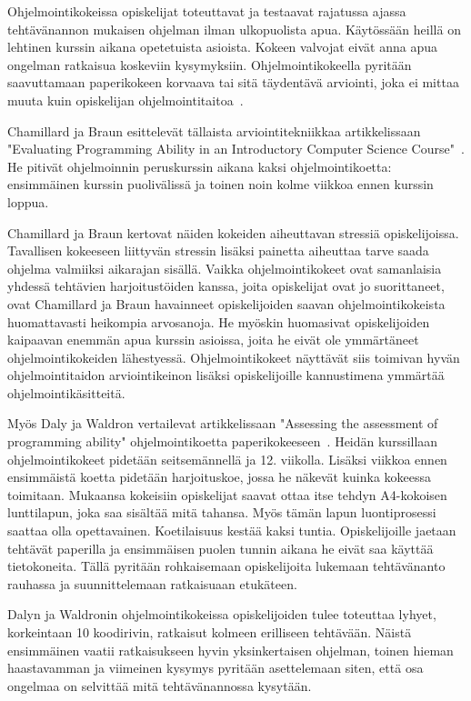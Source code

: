 \documentclass[finnish]{../tktltiki2}
\theoremstyle{definition}
\theoremstyle{remark}
\begin{document}
Ohjelmointikokeissa opiskelijat toteuttavat ja testaavat rajatussa ajassa tehtävänannon mukaisen ohjelman ilman ulkopuolista apua. Käytössään heillä on lehtinen kurssin aikana opetetuista asioista. Kokeen valvojat eivät anna apua ongelman ratkaisua koskeviin kysymyksiin. Ohjelmointikokeella pyritään saavuttamaan paperikokeen korvaava tai sitä täydentävä arviointi, joka ei mittaa muuta kuin opiskelijan ohjelmointitaitoa~\cite{CB00, DW04}.

Chamillard ja Braun esittelevät tällaista arviointitekniikkaa artikkelissaan "Evaluating Programming Ability in an Introductory Computer Science Course"~\cite{CB00}. He pitivät ohjelmoinnin peruskurssin aikana kaksi ohjelmointikoetta: ensimmäinen kurssin puolivälissä ja toinen noin kolme viikkoa ennen kurssin loppua.

Chamillard ja Braun kertovat näiden kokeiden aiheuttavan stressiä opiskelijoissa. Tavallisen kokeeseen liittyvän stressin lisäksi painetta aiheuttaa tarve saada ohjelma valmiiksi aikarajan sisällä. Vaikka ohjelmointikokeet ovat samanlaisia yhdessä tehtävien harjoitustöiden kanssa, joita opiskelijat ovat jo suorittaneet, ovat Chamillard ja Braun havainneet opiskelijoiden saavan ohjelmointikokeista huomattavasti heikompia arvosanoja. He myöskin huomasivat opiskelijoiden kaipaavan enemmän apua kurssin asioissa, joita he eivät ole ymmärtäneet ohjelmointikokeiden lähestyessä. Ohjelmointikokeet näyttävät siis toimivan hyvän ohjelmointitaidon arviointikeinon lisäksi opiskelijoille kannustimena ymmärtää ohjelmointikäsitteitä.

Myös Daly ja Waldron vertailevat artikkelissaan "Assessing the assessment of programming ability" ohjelmointikoetta paperikokeeseen~\cite{DW04}. Heidän kurssillaan ohjelmointikokeet pidetään seitsemännellä ja 12. viikolla. Lisäksi viikkoa ennen ensimmäistä koetta pidetään harjoituskoe, jossa he näkevät kuinka kokeessa toimitaan. Mukaansa kokeisiin opiskelijat saavat ottaa itse tehdyn A4-kokoisen lunttilapun, joka saa sisältää mitä tahansa. Myös tämän lapun luontiprosessi saattaa olla opettavainen. Koetilaisuus kestää kaksi tuntia. Opiskelijoille jaetaan tehtävät paperilla ja ensimmäisen puolen tunnin aikana he eivät saa käyttää tietokoneita. Tällä pyritään rohkaisemaan opiskelijoita lukemaan tehtävänanto rauhassa ja suunnittelemaan ratkaisuaan etukäteen.

Dalyn ja Waldronin ohjelmointikokeissa opiskelijoiden tulee toteuttaa lyhyet, korkeintaan 10 koodirivin, ratkaisut kolmeen erilliseen tehtävään. Näistä ensimmäinen vaatii ratkaisukseen hyvin yksinkertaisen ohjelman, toinen hieman haastavamman ja viimeinen kysymys pyritään asettelemaan siten, että osa ongelmaa on selvittää mitä tehtävänannossa kysytään.
\end{document}
